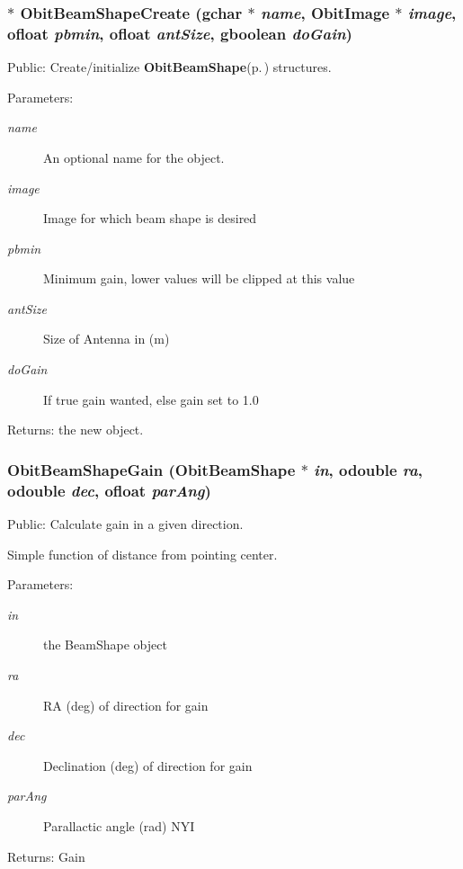 \subsubsection{$\ast$ Obit\-Beam\-Shape\-Create (gchar $\ast$ {\em name}, {\bf Obit\-Image} $\ast$ {\em image}, {\bf ofloat} {\em pbmin}, {\bf ofloat} {\em ant\-Size}, gboolean {\em do\-Gain})}\label{ObitBeamShape_8c_a10}


Public: Create/initialize {\bf Obit\-Beam\-Shape}{\rm (p.\,\pageref{structObitBeamShape})} structures. 

\begin{Desc}
\item[Parameters:]
\begin{description}
\item[{\em name}]An optional name for the object. \item[{\em image}]Image for which beam shape is desired \item[{\em pbmin}]Minimum gain, lower values will be clipped at this value \item[{\em ant\-Size}]Size of Antenna in (m) \item[{\em do\-Gain}]If true gain wanted, else gain set to 1.0 \end{description}
\end{Desc}
\begin{Desc}
\item[Returns:]the new object. \end{Desc}
\subsubsection{ Obit\-Beam\-Shape\-Gain ({\bf Obit\-Beam\-Shape} $\ast$ {\em in}, {\bf odouble} {\em ra}, {\bf odouble} {\em dec}, {\bf ofloat} {\em par\-Ang})}\label{ObitBeamShape_8c_a11}


Public: Calculate gain in a given direction. 

Simple function of distance from pointing center. \begin{Desc}
\item[Parameters:]
\begin{description}
\item[{\em in}]the Beam\-Shape object \item[{\em ra}]RA (deg) of direction for gain \item[{\em dec}]Declination (deg) of direction for gain \item[{\em par\-Ang}]Parallactic angle (rad) NYI \end{description}
\end{Desc}
\begin{Desc}
\item[Returns:]Gain \end{Desc}
